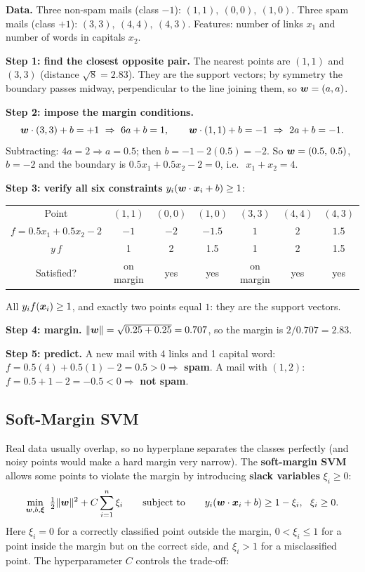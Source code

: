 \begin{example}
\textbf{Data.} Three non-spam mails (class $-1$): $(1,1),\ (0,0),\ (1,0)$. Three spam mails (class $+1$): $(3,3),\ (4,4),\ (4,3)$. Features: number of links $x_1$ and number of words in capitals $x_2$.\par
\textbf{Step 1: find the closest opposite pair.} The nearest points are $(1,1)$ and $(3,3)$ (distance $\sqrt{8}=2.83$). They are the support vectors; by symmetry the boundary passes midway, perpendicular to the line joining them, so $\boldsymbol{w}=(a,a)$.\par
\textbf{Step 2: impose the margin conditions.}
\[
\vect w\cdot(3,3)+b=+1\ \Rightarrow\ 6a+b=1,\qquad
\vect w\cdot(1,1)+b=-1\ \Rightarrow\ 2a+b=-1 .
\]
Subtracting: $4a=2\Rightarrow a=0.5$; then $b=-1-2(0.5)=-2$. So $\boldsymbol{w}=(0.5,\,0.5)$, $b=-2$ and the boundary is $0.5x_1+0.5x_2-2=0$, i.e.\ $\ x_1+x_2=4$.\par
\textbf{Step 3: verify all six constraints} $y_i(\boldsymbol{w}\cdot\boldsymbol{x}_i+b)\ge1$:
\begin{center}
\begin{tabular}{@{}c|cccccc@{}}
\toprule
Point & $(1,1)$ & $(0,0)$ & $(1,0)$ & $(3,3)$ & $(4,4)$ & $(4,3)$\\
$f=0.5x_1+0.5x_2-2$ & $-1$ & $-2$ & $-1.5$ & $1$ & $2$ & $1.5$\\
$y\,f$ & 1 & 2 & 1.5 & 1 & 2 & 1.5\\
Satisfied? & on margin & yes & yes & on margin & yes & yes\\
\bottomrule
\end{tabular}
\end{center}
All $y_if(\boldsymbol{x}_i)\ge1$, and exactly two points equal $1$: they are the support vectors.\par
\textbf{Step 4: margin.} $\|\boldsymbol{w}\|=\sqrt{0.25+0.25}=0.707$, so the margin is $2/0.707=\mathbf{2.83}$.\par
\textbf{Step 5: predict.} A new mail with 4 links and 1 capital word: $f=0.5(4)+0.5(1)-2=0.5>0\Rightarrow$ \textbf{spam}. A mail with $(1,2)$: $f=0.5+1-2=-0.5<0\Rightarrow$ \textbf{not spam}.
\end{example}

\subsection{Soft-Margin SVM}

Real data usually overlap, so no hyperplane separates the classes perfectly (and noisy points would make a hard margin very narrow). The \textbf{soft-margin SVM} allows some points to violate the margin by introducing \textbf{slack variables} $\xi_i\ge0$:
\begin{equation}\label{eq:softsvm}
  \min_{\boldsymbol{w},b,\boldsymbol{\xi}}\ \tfrac12\|\boldsymbol{w}\|^2+C\sum_{i=1}^{n}\xi_i\qquad\text{subject to}\qquad y_i(\boldsymbol{w}\cdot\boldsymbol{x}_i+b)\ge1-\xi_i,\ \ \xi_i\ge0 .
\end{equation}
Here $\xi_i=0$ for a correctly classified point outside the margin, $0<\xi_i\le1$ for a point inside the margin but on the correct side, and $\xi_i>1$ for a misclassified point. The hyperparameter $C$ controls the trade-off:

